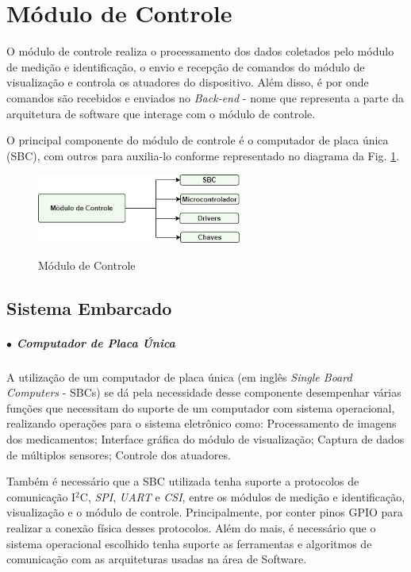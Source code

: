 \section{Módulo de Controle}

O módulo de controle realiza o processamento dos dados coletados pelo módulo de medição e identificação, o envio e recepção de comandos do módulo de visualização e controla os atuadores do dispositivo. Além disso, é por onde comandos são recebidos e enviados  no \textit{Back-end} - nome que representa a parte da arquitetura de software que interage com o módulo de controle. 

O principal componente do módulo de controle é o computador de placa única (SBC), com outros para auxilia-lo conforme representado no diagrama da Fig. \ref{fig:modulo_controle}.


\begin{figure}[H]
    \centering
    {\includegraphics[width=0.6\textwidth]{figuras/eletronica/esquematicos/m_controle.png}}
    \caption{Módulo de Controle} 
    \label{fig:modulo_controle}
\end{figure}

\subsection{Sistema Embarcado}\label{sec:sistema_embarcado}
    \subparagraph*{$\bullet$ Computador de Placa Única}  \hfill
    
    A utilização de um computador de placa única (em inglês \textit{Single Board Computers} - SBCs) se dá pela necessidade desse componente desempenhar várias funções que necessitam do suporte de um computador com sistema operacional, realizando  operações para o sistema eletrônico como: Processamento de imagens dos medicamentos; Interface gráfica do módulo de visualização; Captura de dados de múltiplos sensores; Controle dos atuadores.
    
    Também é necessário que a SBC utilizada tenha suporte a protocolos de comunicação I$^2$C, \textit{SPI}, \textit{UART} e \textit{CSI}, entre os módulos de medição e identificação, visualização e o módulo de controle. Principalmente, por conter pinos GPIO para realizar a conexão física desses protocolos. Além do mais, é necessário que o sistema operacional escolhido tenha suporte as ferramentas e algoritmos de comunicação com as arquiteturas usadas na área de Software.
    
